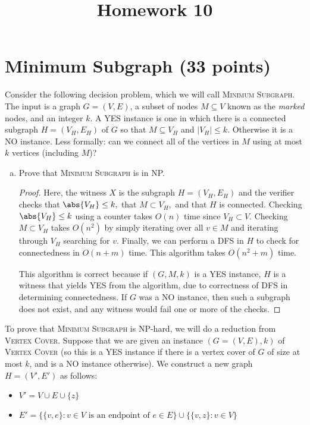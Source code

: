 \documentclass{article}
\begin{document}
\title{Homework 10}
\maketitle
\thispagestyle{fancy}

\section{Minimum Subgraph (33 points)}
Consider the following decision problem, which we will call \textsc{Minimum Subgraph}.  The input is a graph $G = (V, E)$, a subset of nodes $M \subseteq V$ known as the \emph{marked} nodes, and an integer $k$.  A YES instance is one in which there is a connected subgraph $H = (V_H, E_H)$ of $G$ so that $M \subseteq V_H$ and $|V_H| \leq k$.  Otherwise it is a NO instance.  Less formally: can we connect all of the vertices in $M$ using at most $k$ vertices (including $M$)?

\begin{enumerate}[(a)]
	\item Prove that \textsc{Minimum Subgraph} is in NP.
		\begin{proof}
			Here, the witness $X$ is the subgraph $H=(V_H, E_H)$ and the verifier checks that $\abs{V_H}\le k,$ that $M\subset V_H,$ and that $H$ is connected. Checking $\abs{V_H}\le k$ using a counter takes $O(n)$ time since $V_H\subset V.$ Checking $M\subset V_H$ takes $O(n^2)$ by simply iterating over all $v\in M$ and iterating through $V_H$ searching for $v.$ Finally, we can perform a DFS in $H$ to check for connectedness in $O(n+m)$ time. This algorithm takes $O(n^2+m)$ time.

			This algorithm is correct because if $(G, M, k)$ is a YES instance, $H$ is a witness that yields YES from the algorithm, due to correctness of DFS in determining connectedness. If $G$ was a NO instance, then such a subgraph does not exist, and any witness would fail one or more of the checks.
		\end{proof}

\end{enumerate}

To prove that \textsc{Minimum Subgraph} is NP-hard, we will do a reduction from \textsc{Vertex Cover}.  Suppose that we are given an instance $(G = (V, E), k)$ of \textsc{Vertex Cover} (so this is a YES instance if there is a vertex cover of $G$ of size at most $k$, and is a NO instance otherwise).  We construct a new graph $H = (V', E')$ as follows:
\begin{itemize}
	\item $V' = V \cup E \cup \{z\}$
	\item $E' = \{ \{v,e\} : v \in V \text{ is an endpoint of } e \in E\} \cup \{\{v,z\} : v \in V\}$
\end{itemize}  
\end{document}
